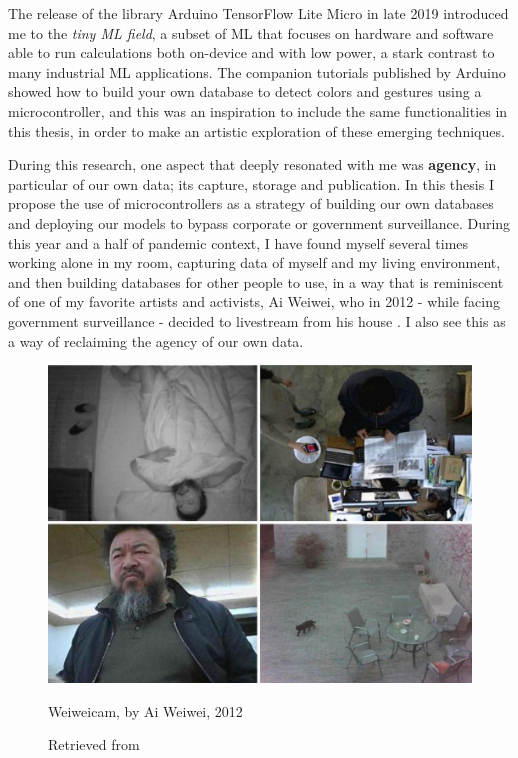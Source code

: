 The release of the library Arduino TensorFlow Lite Micro in late 2019 \cite{google-tensorflow-lite-micro-arduino} introduced me to the \emph{tiny \acrshort{ML} field}, a subset of \acrshort{ML} that focuses on hardware and software able to run calculations both on-device and with low power, a stark contrast to many industrial \acrshort{ML} applications. The companion tutorials published by Arduino \cite{arduino-tensorflow-fruit-identification} showed how to build your own database to detect colors and gestures using a microcontroller, and this was an inspiration to include the same functionalities in this thesis, in order to make an artistic exploration of these emerging techniques.

During this research, one aspect that deeply resonated with me was \textbf{agency}, in particular of our own data; its capture, storage and publication. In this thesis I propose the use of microcontrollers as a strategy of building our own databases and deploying our models to bypass corporate or government surveillance. During this year and a half of pandemic context, I have found myself several times working alone in my room, capturing data of myself and my living environment, and then building databases for other people to use, in a way that is reminiscent of one of my favorite artists and activists, Ai Weiwei, who in 2012 - while facing government surveillance - decided to livestream from his house \cite{website-forbes-ai-weiwei-cam}. I also see this as a way of reclaiming the agency of our own data.

\begin{figure}[ht]
  \centering
  \includegraphics[width=0.75\linewidth,height=0.30\textheight,keepaspectratio]{images/weiweicam.jpg}
  \caption{Weiweicam, by Ai Weiwei, 2012}
  \caption*{Retrieved from \cite{website-forbes-ai-weiwei-cam}}
  \label{fig:weiweicam}
\end{figure}

